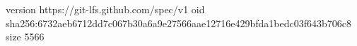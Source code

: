 version https://git-lfs.github.com/spec/v1
oid sha256:6732aeb6712dd7c067b30a6a9e27566aae12716e429bfda1bedc03f643b706c8
size 5566
